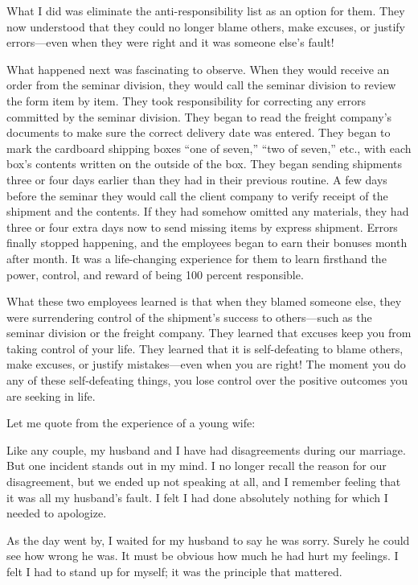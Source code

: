 \documentclass[letterpaper, 11pt]{report}
\newcommand{\intalkheader}[1]{
    \vspace{0.75em}
    \noindent{\normalsize\bfseries #1}
    \par\nopagebreak %
    \vspace{0.25em}
    \nopagebreak     %
}
\begin{document}
What I did was eliminate the anti-­responsibility list as an option for them. They now understood that they could no longer blame others, make excuses, or justify errors—even when they were right and it was someone else’s fault!

What happened next was fascinating to observe. When they would receive an order from the seminar division, they would call the seminar division to review the form item by item. They took responsibility for correcting any errors committed by the seminar division. They began to read the freight company’s documents to make sure the correct delivery date was entered. They began to mark the cardboard shipping boxes “one of seven,” “two of seven,” etc., with each box’s contents written on the outside of the box. They began sending shipments three or four days ­earlier than they had in their previous routine. A few days before the seminar they would call the client company to verify receipt of the shipment and the contents. If they had somehow omitted any materials, they had three or four extra days now to send missing items by express shipment. Errors finally stopped happening, and the employees began to earn their bonuses month after month. It was a life-changing experience for them to learn firsthand the power, control, and reward of being 100 percent responsible.

What these two employees learned is that when they blamed someone else, they were surrendering control of the shipment’s success to ­others—such as the seminar division or the freight company. They learned that excuses keep you from taking control of your life. They learned that it is self-defeating to blame others, make excuses, or justify mistakes—even when you are right! The moment you do any of these self-defeating things, you lose control over the positive outcomes you are seeking in life.

\intalkheader{Story 2: “Putting My Marriage Before My Pride”}
Let me quote from the experience of a young wife:

Like any couple, my husband and I have had disagreements during our marriage. But one incident stands out in my mind. I no longer recall the reason for our disagreement, but we ended up not speaking at all, and I remember feeling that it was all my husband’s fault. I felt I had done absolutely nothing for which I needed to apologize.

As the day went by, I waited for my husband to say he was sorry. Surely he could see how wrong he was. It must be obvious how much he had hurt my feelings. I felt I had to stand up for myself; it was the principle that mattered.
\end{document}
